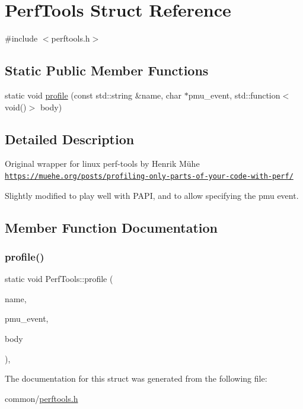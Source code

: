 \hypertarget{structPerfTools}{}\section{Perf\+Tools Struct Reference}
\label{structPerfTools}


{\ttfamily \#include $<$perftools.\+h$>$}

\subsection*{Static Public Member Functions}
\begin{DoxyCompactItemize}
\item 
static void \hyperlink{structPerfTools_a5c1e407eeffce5f82ab0a59a961cf0c5}{profile} (const std\+::string \&name, char $\ast$pmu\+\_\+event, std\+::function$<$ void()$>$ body)
\end{DoxyCompactItemize}


\subsection{Detailed Description}
Original wrapper for linux perf-\/tools by Henrik Mühe \href{https://muehe.org/posts/profiling-only-parts-of-your-code-with-perf/}{\tt https\+://muehe.\+org/posts/profiling-\/only-\/parts-\/of-\/your-\/code-\/with-\/perf/}

Slightly modified to play well with P\+A\+PI, and to allow specifying the pmu event. 

\subsection{Member Function Documentation}
\mbox{\label{structPerfTools_a5c1e407eeffce5f82ab0a59a961cf0c5}} 
\subsubsection{\texorpdfstring{profile()}{profile()}}
{\footnotesize\ttfamily static void Perf\+Tools\+::profile (\begin{DoxyParamCaption}\item[{const std\+::string \&}]{name,  }\item[{char $\ast$}]{pmu\+\_\+event,  }\item[{std\+::function$<$ void()$>$}]{body }\end{DoxyParamCaption})\hspace{0.3cm}{\ttfamily [inline]}, {\ttfamily [static]}}



The documentation for this struct was generated from the following file\+:\begin{DoxyCompactItemize}
\item 
common/\hyperlink{perftools_8h}{perftools.\+h}\end{DoxyCompactItemize}
